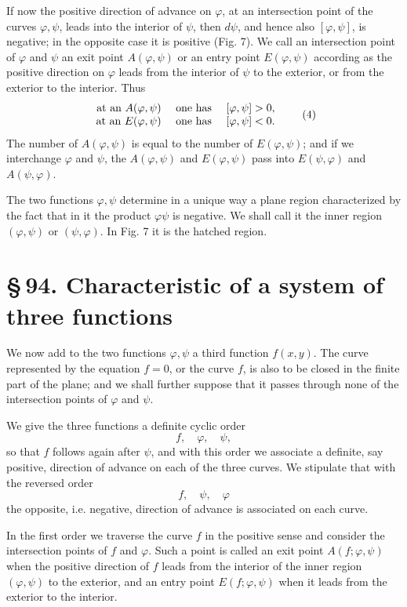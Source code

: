 \documentclass[11pt]{article}
\providecommand{\sect}[2]{\section*{\S\,#1. #2}}
\begin{document}
If now the positive direction of advance on $\varphi$, at an intersection point of the curves $\varphi,\psi$, leads into the interior of $\psi$, then $d\psi$, and hence also $[\varphi,\psi]$, is negative; in the opposite case it is positive (Fig. 7). We call an intersection point of $\varphi$ and $\psi$ an exit point $A(\varphi,\psi)$ or an entry point $E(\varphi,\psi)$ according as the positive direction on $\varphi$ leads from the interior of $\psi$ to the exterior, or from the exterior to the interior. Thus
\begin{equation}
\begin{array}{rcl}
\hbox{at an }A(\varphi,\psi)&\hbox{ one has }&[\varphi,\psi]>0,\\
\hbox{at an }E(\varphi,\psi)&\hbox{ one has }&[\varphi,\psi]<0.
\end{array}
\tag{4}
\end{equation}
The number of $A(\varphi,\psi)$ is equal to the number of $E(\varphi,\psi)$; and if we interchange $\varphi$ and $\psi$, the $A(\varphi,\psi)$ and $E(\varphi,\psi)$ pass into $E(\psi,\varphi)$ and $A(\psi,\varphi)$.

The two functions $\varphi,\psi$ determine in a unique way a plane region characterized by the fact that in it the product $\varphi\psi$ is negative. We shall call it the inner region $(\varphi,\psi)$ or $(\psi,\varphi)$. In Fig. 7 it is the hatched region.

\sect{94}{Characteristic of a system of three functions}

We now add to the two functions $\varphi,\psi$ a third function $f(x,y)$. The curve represented by the equation $f=0$, or the curve $f$, is also to be closed in the finite part of the plane; and we shall further suppose that it passes through none of the intersection points of $\varphi$ and $\psi$.

We give the three functions a definite cyclic order
\[
        f,\quad \varphi,\quad \psi,
\]
so that $f$ follows again after $\psi$, and with this order we associate a definite, say positive, direction of advance on each of the three curves. We stipulate that with the reversed order
\[
        f,\quad \psi,\quad \varphi
\]
the opposite, i.e. negative, direction of advance is associated on each curve.

In the first order we traverse the curve $f$ in the positive sense and consider the intersection points of $f$ and $\varphi$. Such a point is called an exit point $A(f;\varphi,\psi)$ when the positive direction of $f$ leads from the interior of the inner region $(\varphi,\psi)$ to the exterior, and an entry point $E(f;\varphi,\psi)$ when it leads from the exterior to the interior.
\end{document}
